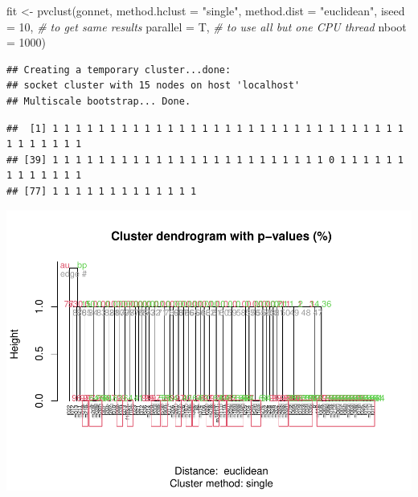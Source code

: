 \documentclass[12pt]{article}
\newenvironment{Shaded}{\begin{snugshade}}{\end{snugshade}}
\newcommand{\AttributeTok}[1]{\textcolor[rgb]{0.77,0.63,0.00}{#1}}
\newcommand{\CommentTok}[1]{\textcolor[rgb]{0.56,0.35,0.01}{\textit{#1}}}
\newcommand{\DecValTok}[1]{\textcolor[rgb]{0.00,0.00,0.81}{#1}}
\newcommand{\FunctionTok}[1]{\textcolor[rgb]{0.00,0.00,0.00}{#1}}
\newcommand{\NormalTok}[1]{#1}
\newcommand{\OtherTok}[1]{\textcolor[rgb]{0.56,0.35,0.01}{#1}}
\newcommand{\SpecialCharTok}[1]{\textcolor[rgb]{0.00,0.00,0.00}{#1}}
\newcommand{\StringTok}[1]{\textcolor[rgb]{0.31,0.60,0.02}{#1}}
\begin{document}
\begin{Shaded}
\begin{Highlighting}[]
\NormalTok{fit }\OtherTok{\textless{}{-}} 
  \FunctionTok{pvclust}\NormalTok{(gonnet, }
  \AttributeTok{method.hclust =} \StringTok{"single"}\NormalTok{,}
  \AttributeTok{method.dist =} \StringTok{"euclidean"}\NormalTok{,}
  \AttributeTok{iseed =} \DecValTok{10}\NormalTok{, }\CommentTok{\# to get same results}
  \AttributeTok{parallel =}\NormalTok{ T, }\CommentTok{\# to use all but one CPU thread}
  \AttributeTok{nboot =} \DecValTok{1000}\NormalTok{) }
\end{Highlighting}
\end{Shaded}

\begin{verbatim}
## Creating a temporary cluster...done:
## socket cluster with 15 nodes on host 'localhost'
## Multiscale bootstrap... Done.
\end{verbatim}

\begin{Shaded}
\end{Shaded}

\begin{verbatim}
##  [1] 1 1 1 1 1 1 1 1 1 1 1 1 1 1 1 1 1 1 1 1 1 1 1 1 1 1 1 1 1 1 1 1 1 1 1 1 1 1
## [39] 1 1 1 1 1 1 1 1 1 1 1 1 1 1 1 1 1 1 1 1 1 1 1 1 0 1 1 1 1 1 1 1 1 1 1 1 1 1
## [77] 1 1 1 1 1 1 1 1 1 1 1 1 1
\end{verbatim}

\includegraphics{JStevenRaquel-paper_files/figure-latex/plot-dendrogram-1.pdf}
\end{document}
